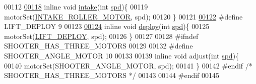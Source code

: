 \begin{DoxyCode}
00112 
\hypertarget{motors_8h_source.tex_l00118}{}\hyperlink{motors_8h_ad29bed7d7fa6127b3ecf7e50eab23e9c}{00118} \textcolor{keyword}{inline} \textcolor{keywordtype}{void} \hyperlink{motors_8h_ad29bed7d7fa6127b3ecf7e50eab23e9c}{intake}(\textcolor{keywordtype}{int} \hyperlink{opcontrol_8c_a642ce334330c8b0f6e33dd0a3fa65111}{spd})\{
00119     motorSet(\hyperlink{motors_8h_a8ac783dc4e09804d3b2f7e3b6bbecad7}{INTAKE\_ROLLER\_MOTOR}, spd);
00120 \}
00121 
\hypertarget{motors_8h_source.tex_l00122}{}\hyperlink{motors_8h_a9e703840acb5657339f59982914dffb7}{00122} \textcolor{preprocessor}{#define LIFT\_DEPLOY 9}
00123 
\hypertarget{motors_8h_source.tex_l00124}{}\hyperlink{motors_8h_af9cae4c2a660189553e6c8e51e371913}{00124} \textcolor{keyword}{inline} \textcolor{keywordtype}{void} \hyperlink{motors_8h_af9cae4c2a660189553e6c8e51e371913}{deploy}(\textcolor{keywordtype}{int} \hyperlink{opcontrol_8c_a642ce334330c8b0f6e33dd0a3fa65111}{spd})\{
00125     motorSet(\hyperlink{motors_8h_a9e703840acb5657339f59982914dffb7}{LIFT\_DEPLOY}, spd);
00126 \}
00127 
00128 \textcolor{preprocessor}{#ifndef SHOOTER\_HAS\_THREE\_MOTORS}
00129 
00132 \textcolor{preprocessor}{#define SHOOTER\_ANGLE\_MOTOR 10}
00133 
00139 \textcolor{keyword}{inline} \textcolor{keywordtype}{void} adjust(\textcolor{keywordtype}{int} \hyperlink{opcontrol_8c_a642ce334330c8b0f6e33dd0a3fa65111}{spd})\{
00140     motorSet(SHOOTER\_ANGLE\_MOTOR, spd);
00141 \}
00142 \textcolor{preprocessor}{#endif }\textcolor{comment}{/* SHOOTER\_HAS\_THREE\_MOTORS */}\textcolor{preprocessor}{}
00143 
00144 \textcolor{preprocessor}{#endif}
00145 
\end{DoxyCode}
